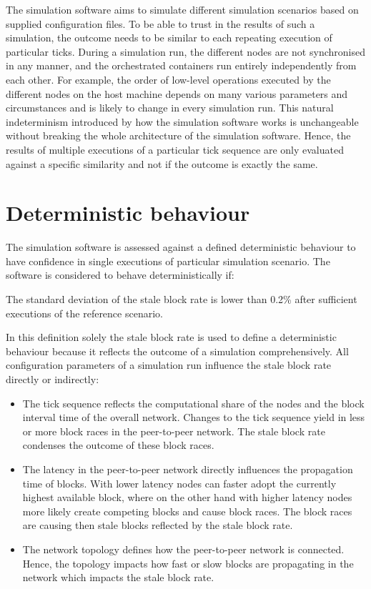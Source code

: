 The simulation software aims to simulate different simulation scenarios based on supplied configuration files.
To be able to trust in the results of  such a simulation, the outcome needs to be similar to each repeating execution of particular ticks.
During a simulation run, the different nodes are not synchronised in any manner, and the orchestrated containers run entirely independently from each other.
For example, the order of low-level operations executed by the different nodes on the host machine depends on many various parameters and circumstances and is likely to change in every simulation run.
This natural indeterminism introduced by how the simulation software works is unchangeable without breaking the whole architecture of the simulation software.
Hence, the results of multiple executions of a particular tick sequence are only  evaluated against a specific similarity and not if the outcome is exactly the same.

\section{Deterministic behaviour} \label{chap:deterministic_behaviour}

The simulation software is assessed against a defined deterministic behaviour to have confidence in single executions of particular simulation scenario.
The software is considered to behave deterministically if:

The standard deviation of the stale block rate is lower than 0.2\% after sufficient executions of the reference scenario.

In this definition solely the stale block rate is used to define a deterministic behaviour because it reflects the outcome of a simulation comprehensively.
All configuration parameters of a simulation run influence the stale block rate directly or indirectly\cite{gervais2016security}:

\begin{itemize}
	\item The tick sequence reflects the computational share of the nodes and the block interval time of the overall network. Changes to the tick sequence yield in less or more block races in the peer-to-peer network.
	The stale block rate condenses the outcome of these block races.
	\item The latency in the peer-to-peer network directly influences the propagation time of blocks.
	With lower latency nodes can faster adopt the currently highest available block, where on the other hand with higher latency nodes more likely create competing blocks and cause block races.
	The block races are causing then stale blocks reflected by the stale block rate.
	\item The network topology defines how the peer-to-peer network is connected.
	Hence, the topology impacts how fast or slow blocks are propagating in the network which impacts the stale block rate.
\end{itemize}

